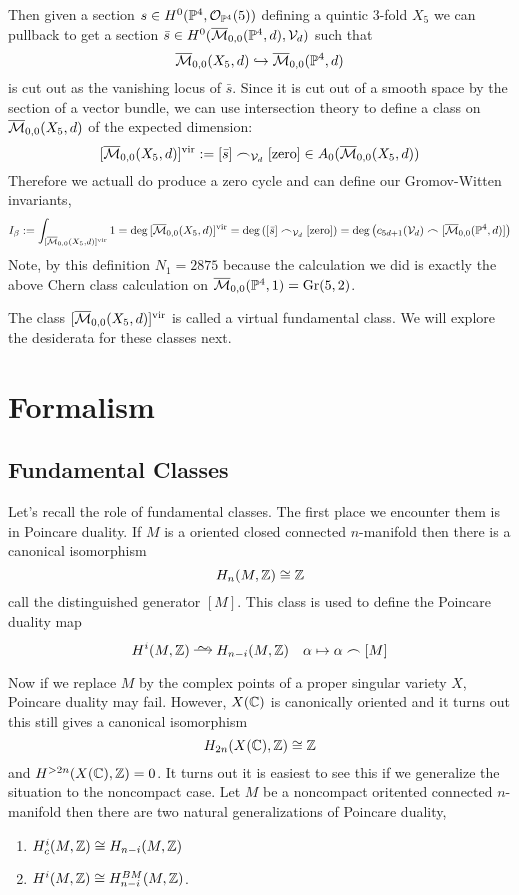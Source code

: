 \documentclass[12pt]{article}
\newcommand{\Mbar}{\ol{\M}}
\begin{document}
\newcommand{\vir}{\mathrm{vir}}

Then given a section $s \in H^0(\mathbb{P}^4, \mathcal{O}_{\mathbb{P}^4}(5))$ defining a quintic 3-fold $X_5$ we can pullback to get a section $\bar{s} \in H^0(\Mbar_{0,0}(\P^4, d), \cV_d)$ such that
\[ \Mbar_{0,0}(X_5, d) \embed \Mbar_{0,0}(\P^4, d) \]
is cut out as the vanishing locus of $\bar{s}$. Since it is cut out of a smooth space by the section of a vector bundle, we can use intersection theory to define a class on $\Mbar_{0,0}(X_5, d)$ of the expected dimension:
\[ [\Mbar_{0,0}(X_5, d)]^{\vir} := [\bar{s}] \frown_{\cV_d} [\text{zero}]  \in A_{0}(\Mbar_{0,0}(X_5, d)) \]
Therefore we actuall do produce a zero cycle and can define our Gromov-Witten invariants,
\[ I_\beta := \int_{[\Mbar_{0,0}(X_5, d)]^{\vir}} 1 = \deg{[\Mbar_{0,0}(X_5, d)]^{\vir}} = \deg{\left( [\bar{s}] \frown_{\cV_d} [\text{zero}] \right)} = \deg{ \left( c_{5d + 1}(\cV_d) \frown [\Mbar_{0,0}(\P^4, d)] \right) } \]
Note, by this definition $N_1 = 2875$ because the calculation we did is exactly the above Chern class calculation on $\Mbar_{0,0}(\P^4, 1) = \mathrm{Gr}(5, 2)$.

\begin{example}

\end{example}

The class $[\Mbar_{0,0}(X_5, d)]^{\vir}$ is called a virtual fundamental class. We will explore the desiderata for these classes next.

\section{Formalism}

\subsection{Fundamental Classes}

Let's recall the role of fundamental classes. The first place we encounter them is in Poincare duality. If $M$ is a oriented closed connected $n$-manifold then there is a canonical isomorphism
\[ H_n(M, \mathbb{Z}) \cong \mathbb{Z} \]
call the distinguished generator $[M]$. This class is used to define the Poincare duality map 
\[ H^i(M, \Z) \iso H_{n-i}(M, \Z) \quad \alpha \mapsto \alpha \frown [M] \]

Now if we replace $M$ by the complex points of a proper singular variety $X$, Poincare duality may fail. However, $X(\mathbb{C})$ is canonically oriented and it turns out this still gives a canonical isomorphism
\[ H_{2n}(X(\mathbb{C}), \mathbb{Z}) \cong \mathbb{Z} \]
and $H^{>2n}(X(\mathbb{C}), \mathbb{Z}) = 0$. It turns out it is easiest to see this if we generalize the situation to the noncompact case. Let $M$ be a noncompact oritented connected $n$-manifold then there are two natural generalizations of Poincare duality,
\begin{enumerate}
\item $H_c^i(M, \mathbb{Z}) \cong H_{n-i}(M, \mathbb{Z})$
\item $H^i(M, \mathbb{Z}) \cong H_{n-i}^{BM}(M, \mathbb{Z})$.
\end{enumerate}
\end{document}
